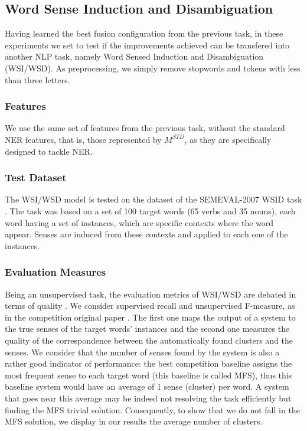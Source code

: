 \subsection{Word Sense Induction and Disambiguation}
Having learned the best fusion configuration from the previous task, in these experiments we set to test if the improvements achieved can be transfered into another NLP task, namely Word Sensed Induction and Disambiguation (WSI/WSD). As preprocessing, we simply remove stopwords and tokens with less than three letters.

\subsubsection{Features}
We use the same set of features from the previous task, without the standard NER features, that is, those represented by $M^{STD}$, as they are specifically designed to tackle NER.
\subsubsection{Test Dataset}
The WSI/WSD model is tested on the dataset of  the SEMEVAL-2007 WSID task \cite{Agirre2007}. The task was based on a set of 100 target words (65 verbs and 35 nouns), each  word having a set of instances, which are specific contexts where the word appear. Senses are induced from these contexts and applied to each one of the instances.


\subsubsection{Evaluation Measures}
Being an unsupervised task, the evaluation metrics of WSI/WSD are debated in terms of quality \cite{CruysA11}. We consider supervised recall and unsupervised F-measure, as in the competition original paper \cite{Agirre2007}. The first one maps the output of a system to the true senses of the target words' instances and the second one measures the quality of the correspondence between the automatically found clusters and the senses. 
We consider that the number of senses found by the system is also a rather good indicator of performance: the best competition baseline assigns the most frequent sense to each target word (this baseline is called MFS), thus this baseline system would have an average of 1 sense (cluster) per word. A system that goes near this average may be indeed not resolving the task efficiently but finding the MFS trivial solution. Consequently, to show that we do not fall in the MFS solution, we display in our results the average number of clusters.

